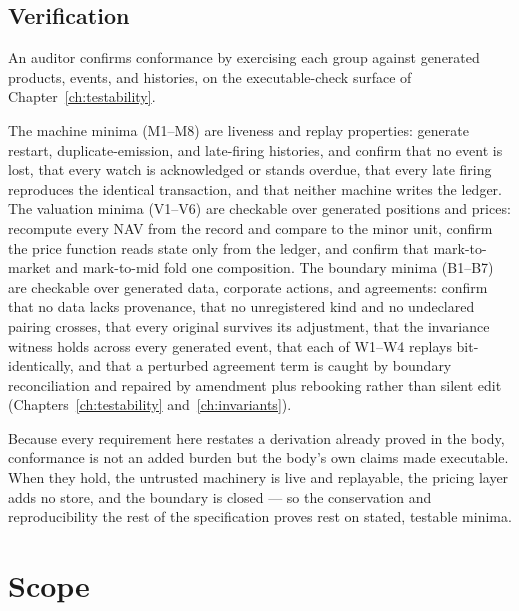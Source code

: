 \documentclass[11pt,a4paper]{article}
\begin{document}
\subsection{Verification}

An auditor confirms conformance by exercising each group against generated products,
events, and histories, on the executable-check surface of Chapter~\ref{ch:testability}.

The machine minima (M1--M8) are liveness and replay properties: generate restart,
duplicate-emission, and late-firing histories, and confirm that no event is lost, that
every watch is acknowledged or stands overdue, that every late firing reproduces the
identical transaction, and that neither machine writes the ledger. The valuation minima
(V1--V6) are checkable over generated positions and prices: recompute every NAV from the
record and compare to the minor unit, confirm the price function reads state only from the
ledger, and confirm that mark-to-market and mark-to-mid fold one composition. The boundary
minima (B1--B7) are checkable over generated data, corporate actions, and agreements:
confirm that no
data lacks provenance, that no unregistered kind and no undeclared pairing crosses, that
every original survives its adjustment, that the invariance witness holds across every
generated event, that each of W1--W4 replays bit-identically, and that a perturbed
agreement term is caught by boundary reconciliation and repaired by amendment plus
rebooking rather than silent edit
(Chapters~\ref{ch:testability} and~\ref{ch:invariants}).

Because every requirement here restates a derivation already proved in the body,
conformance is not an added burden but the body's own claims made executable. When they
hold, the untrusted machinery is live and replayable, the pricing layer adds no store, and
the boundary is closed --- so the conservation and reproducibility the rest of the
specification proves rest on stated, testable minima.

\section{Scope}\label{ch:scope}
\end{document}
